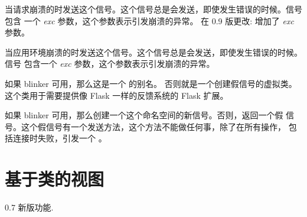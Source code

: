 \documentclass[a4paper,12pt]{sphinxmanual}
\begin{document}
\begin{fulllineitems}
\label{api:flask.request_tearing_down}
当请求崩溃的时发送这个信号。这个信号总是会发送，即使发生错误的时候。信号包含
一个 \emph{exc} 参数，这个参数表示引发崩溃的异常。
在 0.9 版更改: 增加了 \emph{exc} 参数。
\end{fulllineitems}


\begin{fulllineitems}
\label{api:flask.appcontext_tearing_down}
当应用环境崩溃的时发送这个信号。这个信号总是会发送，即使发生错误的时候。信号
包含一个 \emph{exc} 参数，这个参数表示引发崩溃的异常。

\end{fulllineitems}


\begin{fulllineitems}
\label{api:flask.signals.Namespace}
如果 blinker 可用，那么这是一个 \href{http://discorporate.us/projects/Blinker/docs/1.1/api.html\#blinker.base.Namespace}{} 的别名。
否则就是一个创建假信号的虚拟类。这个类用于需要提供像 Flask 一样的反馈系统的
Flask 扩展。

\begin{fulllineitems}
\label{api:flask.signals.Namespace.signal}
如果 blinker 可用，那么创建一个这个命名空间的新信号。否则，返回一个假
信号。这个假信号有一个发送方法，这个方法不能做任何事，除了在所有操作，
包括连接时失败，引发一个 \href{http://docs.python.org/dev/library/exceptions.html\#RuntimeError}{} 。

\end{fulllineitems}


\end{fulllineitems}



\section{基于类的视图}
\label{api:blinker}\label{api:id16}0.7 新版功能.
\end{document}
